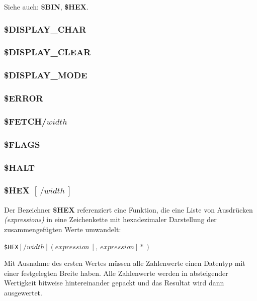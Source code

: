 \documentclass{scrartcl}
\begin{document}
\vspace{10pt}
\noindent Siehe auch: \textbf{\$BIN}, \textbf{\$HEX}.

\subsubsection{\$DISPLAY\_CHAR}

\subsubsection{\$DISPLAY\_CLEAR}

\subsubsection{\$DISPLAY\_MODE}

\subsubsection{\$ERROR}

\subsubsection{\$FETCH/$width$}

\subsubsection{\$FLAGS}

\subsubsection{\$HALT}

\subsubsection{\$HEX $[~/width~]$}

\noindent Der Bezeichner \textbf{\$HEX} referenziert eine Funktion, die eine Liste von Ausdrücken \textit{(expressions)} in eine Zeichenkette mit hexadezimaler Darstellung der zusammengefügten Werte umwandelt:

\vspace{10pt}
\texttt{\$HEX$[/width](expression~[,~expression]*)$}

\vspace{10pt}
\noindent Mit Ausnahme des ersten Wertes müssen alle Zahlenwerte einen Datentyp mit einer festgelegten Breite haben. Alle Zahlenwerte werden in absteigender Wertigkeit bitweise hintereinander gepackt und das Resultat wird dann ausgewertet.
\end{document}
